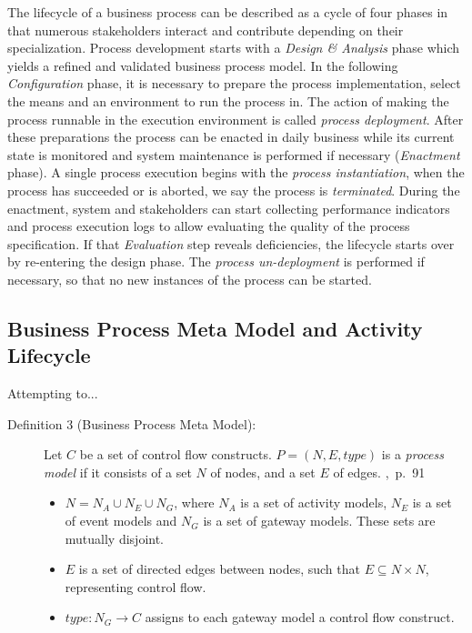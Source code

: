 \noindent
The lifecycle of a business process can be described as a cycle of four phases in that numerous stakeholders interact and contribute depending on their specialization.
Process development starts with a \emph{Design \& Analysis} phase which yields a refined and validated business process model.
In the following \emph{Configuration} phase, it is necessary to prepare the process implementation, select the means and an environment to run the process in.
The action of making the process runnable in the execution environment is called \emph{process deployment}.
After these preparations the process can be enacted in daily business while its current state is monitored and system maintenance is performed if necessary (\emph{Enactment} phase). 
A single process execution begins with the \emph{process instantiation}, when the process has succeeded or is aborted, we say the process is \emph{terminated}.
During the enactment, system and stakeholders can start collecting performance indicators and process execution logs to allow evaluating the quality of the process specification. If that \emph{Evaluation} step reveals deficiencies, the lifecycle starts over by re-entering the design phase.
The \emph{process un-deployment} is performed if necessary, so that no new instances of the process can be started.
\cite[p.~11~ff.]{weske:bpm-book}

\subsection{Business Process Meta Model and Activity Lifecycle}\label{ch:bg:bpmetamodel}
Attempting to...

\begin{description}
	\item[Definition 3 (Business Process Meta Model):]
	Let $C$ be a set of control flow constructs. $P = (N,E,type)$ is a \textit{process model} if it consists of a set $N$ of nodes, and a set $E$ of edges. \cite{weske:bpm-book},~p.~91
	\begin{itemize} 
		\item
		$N = N_{A}\cup N_{E}\cup N_{G}$, where $N_{A}$ is a set of activity models, $N_{E}$ is a set of event models and $N_{G}$ is a set of gateway models. These sets are mutually disjoint.
		\item 
		$E$ is a set of directed edges between nodes, such that $E\subseteq N \times N$, representing control flow.
		\item
		$type:N_{G}\rightarrow C$ assigns to each gateway model a control flow construct.
	\end{itemize}
\end{description}

